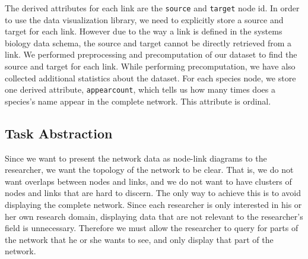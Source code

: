 \documentclass[journal]{vgtc}                %
\begin{document}
The derived attributes for each link are the \texttt{source} and \texttt{target} node id. In order to use the data visualization library, we need to explicitly store a source and target for each link. However due to the way a link is defined in the systems biology data schema, the source and target cannot be directly retrieved from a link. We performed preprocessing and precomputation of our dataset to find the source and target for each link. While performing precomputation, we have also collected additional statistics about the dataset. For each species node, we store one derived attribute, \texttt{appear\textunderscore count}, which tells us how many times does a species’s name appear in the complete network. This attribute is ordinal.



\subsection{Task Abstraction}
Since we want to present the network data as node-link diagrams to the researcher, we want the topology of the network to be clear. That is, we do not want overlaps between nodes and links, and we do not want to have clusters of nodes and links that are hard to discern. The only way to achieve this is to avoid displaying the complete network. Since each researcher is only interested in his or her own research domain, displaying data that are not relevant to the researcher’s field is unnecessary. Therefore we must allow the researcher to query for parts of the network that he or she wants to see, and only display that part of the network. 
\end{document}

